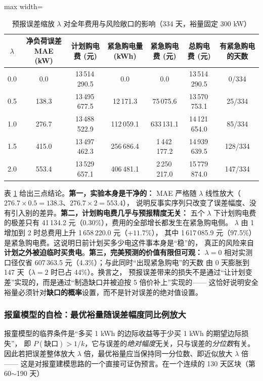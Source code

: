 \documentclass{cumcmthesis}
\begin{document}
\begin{table}[htbp]
\centering
\caption{预报误差缩放 $\lambda$ 对全年费用与风险敞口的影响（334 天，裕量固定 300 kW）}
\label{tab:q2_sens_lam}
\begin{adjustbox}{max width=\textwidth}
\begin{tabular}{ccccccc}
\hline
$\lambda$ & 净负荷误差 MAE (kW) & 计划购电费 (元) & 紧急购电量 (kWh) & 紧急购电费 (元) & 总购电费 (元) & 有紧急购电的天数 \\
\hline
0.0 & 0.0 & 13\,514\,290.5 & 0.0 & 0.0 & 13\,514\,290.5 & 0/334 \\
0.5 & 138.3 & 13\,495\,677.5 & 12\,171.3 & 75\,075.6 & 13\,570\,753.1 & 25/334 \\
1.0 & 276.7 & 13\,488\,522.9 & 112\,059.1 & 633\,131.1 & 14\,121\,654.0 & 85/334 \\
1.5 & 415.0 & 13\,497\,462.3 & 256\,686.4 & 1\,442\,177.2 & 14\,939\,639.5 & 128/334 \\
2.0 & 553.4 & 13\,529\,657.1 & 406\,481.1 & 2\,250\,217.0 & 15\,779\,874.0 & 147/334 \\
\hline
\end{tabular}
\end{adjustbox}
\end{table}

\noindent 表 \ref{tab:q2_sens_lam} 给出三点结论。\textbf{第一，实验本身是干净的：}
MAE 严格随 $\lambda$ 线性放大（$276.7\times0.5=138.3$、$276.7\times2=553.4$），
说明反事实序列只改变了误差幅度、没有引入别的差异。\textbf{第二，计划购电费几乎与预报精度无关：}
五个 $\lambda$ 下计划购电费的极差只有 41\,134.2 元（0.30\%），费用的全部增长都发生在紧急购电侧。
$\lambda$ 由 1 增加到 2 时总费用上升 1\,658\,220.0 元（$+11.7\%$），
其中 1\,617\,085.9 元（97.5\%）是紧急购电费。这说明日前计划买多少电这件事本身是“稳”的，
真正的风险来自\textbf{计划之外被迫临时买贵电}。\textbf{第三，完美预测的价值有限但可观：}
$\lambda=0$ 相对实测口径仅省 607\,363.5 元（4.3\%）；与此同时“出现紧急购电”的天数
由 0 天膨胀到 147 天（$\lambda=2$ 时已占 44\%）。换言之，
预报误差带来的损失不是通过“让计划变差”实现的，而是通过“制造缺口并被迫按 5 倍价补上”实现的——
这恰好说明安全裕量必须针对\textbf{缺口的概率}设置，而不是针对误差的绝对值设置。

\subsubsection{报童模型的自检：最优裕量随误差幅度同比例放大}
报童模型的临界条件是“多买 1 kWh 的边际收益等于少买 1 kWh 的期望边际损失”，
即 $P(\text{缺口})>1/k$，它与误差的\emph{绝对幅度}无关，只与误差的\emph{分位数}有关。
因此若把误差整体放大 $\lambda$ 倍，最优裕量应当保持同一分位数、即近似放大 $\lambda$ 倍——
这是对报童建模思路的一个直接可证伪预言。在一个连续的 130 天区块（第 60$\sim$190 天）
\end{document}
